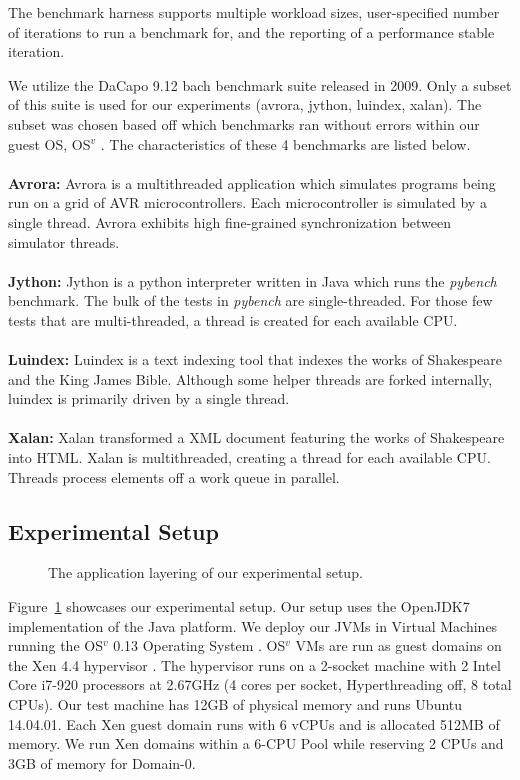 \documentclass{sig-alternate}
\begin{document}
The benchmark harness supports multiple workload sizes, user-specified number of iterations to run a benchmark for, and the reporting of a performance stable iteration.

We utilize the DaCapo 9.12 bach benchmark suite released in 2009. Only a subset of this suite is used for our experiments (avrora, jython, luindex, xalan). The subset was chosen based off which benchmarks ran without errors within our guest OS, OS$^{v}$ \cite{aviOSv2014}. The characteristics of these 4 benchmarks are listed below.
\\\\
\textbf{Avrora:} Avrora is a multithreaded application which simulates programs being run on a grid of AVR microcontrollers. Each microcontroller is simulated by a single thread. Avrora exhibits high fine-grained synchronization between simulator threads.
\\\\
\textbf{Jython:} Jython is a python interpreter written in Java which runs the \textit{pybench} benchmark. The bulk of the tests in \textit{pybench} are single-threaded. For those few tests that are multi-threaded, a thread is created for each available CPU. 
\\\\
\textbf{Luindex:} Luindex is a text indexing tool that indexes the works of Shakespeare and the King James Bible. Although some helper threads are forked internally, luindex is primarily driven by a single thread.
\\\\
\textbf{Xalan:} Xalan transformed a XML document featuring the works of Shakespeare into HTML. Xalan is multithreaded, creating a thread for each available CPU. Threads process elements off a work queue in parallel.

\subsection{Experimental Setup}\label{subsec:expsetup}
\begin{figure}
\centering
{}
\caption{The application layering of our experimental setup.}
\label{fig:dacaposetup}
\end{figure}

Figure~\ref{fig:dacaposetup} showcases our experimental setup. Our setup uses the OpenJDK7 implementation of the Java platform. We deploy our JVMs in Virtual Machines running the OS$^{v}$ 0.13 Operating System \cite{aviOSv2014}. OS$^{v}$ VMs are run as guest domains on the Xen 4.4 hypervisor \cite{barham2003xen}. The hypervisor runs on a 2-socket machine with 2 Intel Core i7-920 processors at 2.67GHz (4 cores per socket, Hyperthreading off,  8 total CPUs).  Our test machine has 12GB of physical memory and runs Ubuntu 14.04.01. Each Xen guest domain runs with 6 vCPUs and is allocated 512MB of memory. We run Xen domains within a 6-CPU Pool while reserving 2 CPUs and 3GB of memory for Domain-0.  
\end{document}
